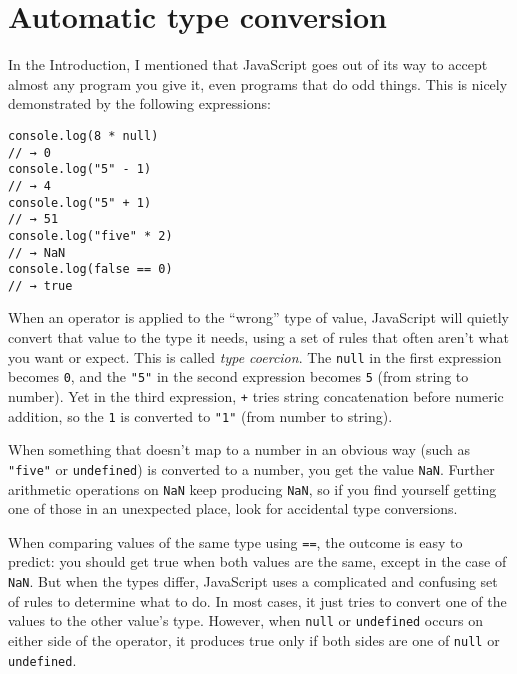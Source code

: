 \section{Automatic type conversion}

In the Introduction, I mentioned that JavaScript goes out of its way to accept almost any program you give it, even programs that do odd things. This is nicely demonstrated by the following expressions:

\begin{lstlisting}
console.log(8 * null)
// → 0
console.log("5" - 1)
// → 4
console.log("5" + 1)
// → 51
console.log("five" * 2)
// → NaN
console.log(false == 0)
// → true
\end{lstlisting}
\noindent{}

When an operator is applied to the ``wrong'' type of value, JavaScript will quietly convert that value to the type it needs, using a set of rules that often aren't what you want or expect. This is called \emph{type coercion}. The \lstinline`null` in the first expression becomes \lstinline`0`, and the \lstinline`"5"` in the second expression becomes \lstinline`5` (from string to number). Yet in the third expression, \lstinline`+` tries string concatenation before numeric addition, so the \lstinline`1` is converted to \lstinline`"1"` (from number to string).

When something that doesn't map to a number in an obvious way (such as \lstinline`"five"` or \lstinline`undefined`) is converted to a number, you get the value \lstinline`NaN`. Further arithmetic operations on \lstinline`NaN` keep producing \lstinline`NaN`, so if you find yourself getting one of those in an unexpected place, look for accidental type conversions.

When comparing values of the same type using \lstinline`==`, the outcome is easy to predict: you should get true when both values are the same, except in the case of \lstinline`NaN`. But when the types differ, JavaScript uses a complicated and confusing set of rules to determine what to do. In most cases, it just tries to convert one of the values to the other value's type. However, when \lstinline`null` or \lstinline`undefined` occurs on either side of the operator, it produces true only if both sides are one of \lstinline`null` or \lstinline`undefined`.

